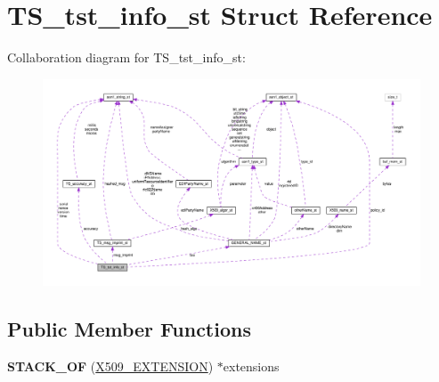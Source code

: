 \hypertarget{structTS__tst__info__st}{}\section{T\+S\+\_\+tst\+\_\+info\+\_\+st Struct Reference}
\label{structTS__tst__info__st}


Collaboration diagram for T\+S\+\_\+tst\+\_\+info\+\_\+st\+:
\nopagebreak
\begin{figure}[H]
\begin{center}
\leavevmode
\includegraphics[width=350pt]{structTS__tst__info__st__coll__graph}
\end{center}
\end{figure}
\subsection*{Public Member Functions}
\begin{DoxyCompactItemize}
\item 
\mbox{\label{structTS__tst__info__st_aed2c28090eea24c3b1b8811cc32af73a}} 
{\bfseries S\+T\+A\+C\+K\+\_\+\+OF} (\hyperlink{structX509__extension__st}{X509\+\_\+\+E\+X\+T\+E\+N\+S\+I\+ON}) $\ast$extensions
\end{DoxyCompactItemize}
